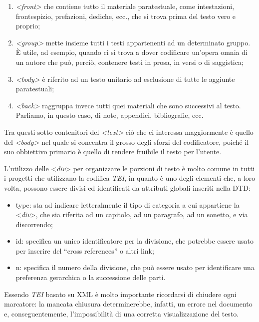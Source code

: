 \documentclass[
  b5paper,
  twoside,
  12pt,
  chapterprefix=false,
  bibliography=totocnumbered,
  parskip=false]{scrbook}
\begin{document}
\begin{enumerate}
\def\labelenumi{\arabic{enumi}.}
\item
  \emph{\textless front\textgreater{}} che contiene tutto il materiale paratestuale, come
  intestazioni, frontespizio, prefazioni, dediche, ecc., che si trova
  prima del testo vero e proprio;
\item
  \emph{\textless group\textgreater{}} mette insieme tutti i testi appartenenti ad un
  determinato gruppo. È utile, ad esempio, quando ci si trova a dover
  codificare un'opera omnia di un autore che può, perciò, contenere
  testi in prosa, in versi o di saggistica;
\item
  \emph{\textless body\textgreater{}} è riferito ad un testo unitario ad esclusione di tutte le
  aggiunte paratestuali;
\item
  \emph{\textless back\textgreater{}} raggruppa invece tutti quei materiali che sono successivi
  al testo. Parliamo, in questo caso, di note, appendici,
  bibliografie, ecc.
\end{enumerate}

Tra questi sotto contenitori del \emph{\textless text\textgreater{}} ciò che ci interessa
maggiormente è quello del \emph{\textless body\textgreater{}} nel quale si concentra il grosso
degli sforzi del codificatore, poiché il suo obbiettivo primario è
quello di rendere fruibile il testo per l'utente.

L'utilizzo delle \textless{}\emph{div}\textgreater{} per organizzare le porzioni di testo è molto
comune in tutti i progetti che utilizzano la codifica \emph{TEI}, in quanto è
uno degli elementi che, a loro volta, possono essere divisi ed
identificati da attributi globali inseriti nella DTD:

\begin{itemize}
\item
  type: sta ad indicare letteralmente il tipo di categoria a cui
  appartiene la \textless{}\emph{div}\textgreater, che sia riferita ad un capitolo, ad un
  paragrafo, ad un sonetto, e via discorrendo;
\item
  id: specifica un unico identificatore per la divisione, che potrebbe
  essere usato per inserire del \enquote{cross references} o altri link;
\item
  n: specifica il numero della divisione, che può essere usato per
  identificare una preferenza gerarchica o la successione delle parti.
\end{itemize}

Essendo \emph{TEI} basato su XML è molto importante ricordarsi di chiudere
ogni marcatore: la mancata chiusura determinerebbe, infatti, un errore
nel documento e, conseguentemente, l'impossibilità di una corretta
visualizzazione del testo.
\end{document}
